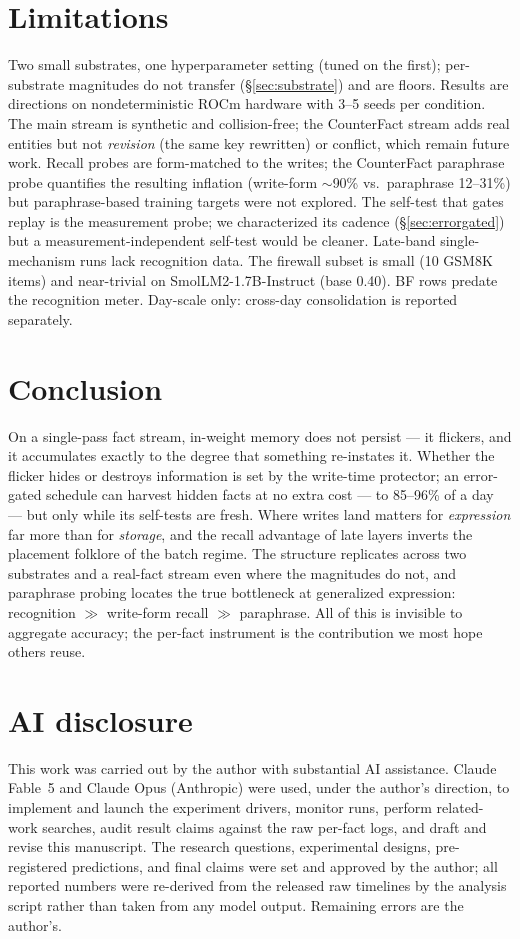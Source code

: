 \documentclass[11pt]{article}
\newcommand{\smol}{SmolLM2-1.7B-Instruct}
\begin{document}
\section{Limitations}\label{sec:limits}

Two small substrates, one hyperparameter setting (tuned on the first); per-substrate magnitudes do
not transfer (\S\ref{sec:substrate}) and are floors. Results are directions on nondeterministic ROCm
hardware with 3--5 seeds per condition. The main stream is synthetic and collision-free; the CounterFact stream adds real entities but not
\emph{revision} (the same key rewritten) or conflict, which remain future work. Recall probes are
form-matched to the writes; the CounterFact paraphrase probe quantifies the resulting inflation
(write-form $\sim$90\% vs.\ paraphrase 12--31\%) but paraphrase-based training targets were not
explored. The self-test that gates replay is
the measurement probe; we characterized its cadence (\S\ref{sec:errorgated}) but a
measurement-independent self-test would be cleaner. Late-band single-mechanism runs lack recognition
data. The firewall subset is small (10 GSM8K items) and near-trivial on \smol{} (base 0.40). BF rows
predate the recognition meter. Day-scale only: cross-day consolidation is reported separately.

\section{Conclusion}

On a single-pass fact stream, in-weight memory does not persist --- it flickers, and it accumulates
exactly to the degree that something re-instates it. Whether the flicker hides or destroys
information is set by the write-time protector; an error-gated schedule can harvest hidden facts at
no extra cost --- to 85--96\% of a day --- but only while its self-tests are fresh. Where writes land
matters for \emph{expression} far more than for \emph{storage}, and the recall advantage of late
layers inverts the placement folklore of the batch regime. The structure replicates across two
substrates and a real-fact stream even where the magnitudes do not, and paraphrase probing locates
the true bottleneck at generalized expression: recognition $\gg$ write-form recall $\gg$ paraphrase. All of this is invisible to aggregate accuracy; the
per-fact instrument is the contribution we most hope others reuse.

\section*{AI disclosure}
This work was carried out by the author with substantial AI assistance. Claude Fable~5 and Claude
Opus (Anthropic) were used, under the author's direction, to implement and launch the experiment
drivers, monitor runs, perform related-work searches, audit result claims against the raw per-fact
logs, and draft and revise this manuscript. The research questions, experimental designs,
pre-registered predictions, and final claims were set and approved by the author; all reported
numbers were re-derived from the released raw timelines by the analysis script rather than taken
from any model output. Remaining errors are the author's.
\end{document}
